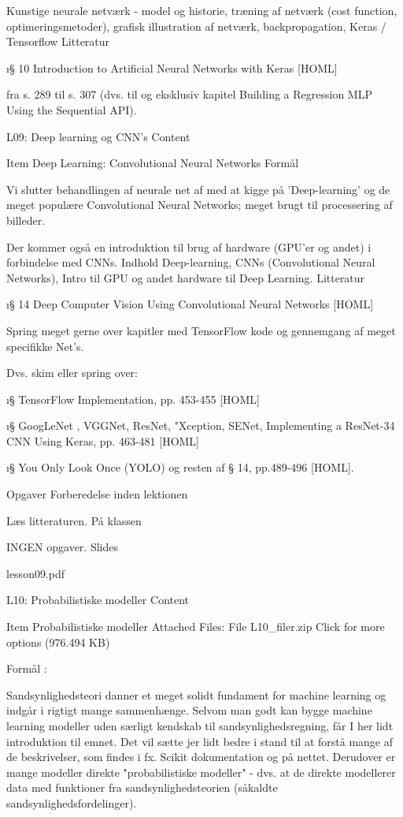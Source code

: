 Kunstige neurale netværk - model og historie, træning af netværk (cost
function, optimeringsmetoder), grafisk illustration af netværk,
backpropagation, Keras / Tensorflow Litteratur

\i{§ 10 Introduction to Artificial Neural Networks with Keras} [HOML]

fra s. 289 til s. 307 (dvs. til og eksklusiv kapitel Building a Regression MLP Using the Sequential API).





L09: Deep learning og CNN's
Content

    Item
    Deep Learning: Convolutional Neural Networks
    Formål

    Vi slutter behandlingen af neurale net af med at kigge på 'Deep-learning' og de meget populære Convolutional Neural Networks; meget brugt til processering af billeder.

    Der kommer også en introduktion til brug af hardware (GPU'er og andet) i forbindelse med CNNs.
    Indhold
        Deep-learning,
        CNNs (Convolutional Neural Networks),
        Intro til GPU og andet hardware til Deep Learning.
    Litteratur

    \i{§ 14 Deep Computer Vision Using Convolutional Neural Networks} [HOML]

    Spring meget gerne over kapitler med TensorFlow kode og gennemgang af meget specifikke  Net's.

    Dvs.  skim eller spring over:

    \i{§  TensorFlow Implementation},  pp. 453-455 [HOML]

    \i{§  GoogLeNet , VGGNet, ResNet, "Xception, SENet, Implementing a
    ResNet-34 CNN Using Keras}, pp.  463-481 [HOML]

    \i{§ You Only Look Once (YOLO)} og resten af § 14, pp.489-496 [HOML].

    Opgaver
    Forberedelse inden lektionen

    Læs litteraturen.
    På klassen

    INGEN opgaver.
    Slides

     lesson09.pdf


 L10: Probabilistiske modeller
Content

    Item
    Probabilistiske modeller
    Attached Files:
        File L10_filer.zip Click for more options (976.494 KB)

    Formål :

    Sandsynlighedsteori danner et meget solidt fundament for machine learning og indgår i rigtigt mange sammenhænge. Selvom man godt kan bygge machine learning modeller uden særligt kendskab til sandsynlighedsregning, får I her lidt introduktion til emnet. Det vil sætte jer lidt bedre i stand til at forstå mange af de beskrivelser, som findes i fx. Scikit dokumentation og på nettet. Derudover er mange modeller direkte "probabilistiske modeller" - dvs. at de direkte modellerer data med funktioner fra sandsynlighedsteorien (såkaldte sandsynlighedsfordelinger).


